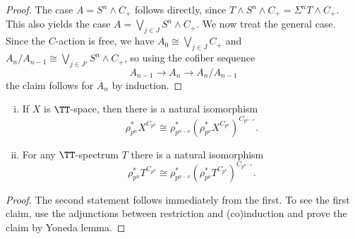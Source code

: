 \begin{proof}
The case $A= S^n\wedge C_+$ follows directly, since $T\wedge S^n\wedge C_+ = 
\Sigma^n T\wedge C_+$. This also yields the case $A = \bigvee_{j\in J} S^n\wedge C_+$.
We now treat the general case. Since the $C$-action
is free, we have 
$A_0 \cong \bigvee_{j\in J} C_+$ and $A_n/A_{n-1}\cong \bigvee_{j\in J'} S^n\wedge C_+$,
so using the cofiber sequence
\[A_{n-1}\to A_n\to A_n/A_{n-1} \]
the claim follows for $A_n$ by induction.
\end{proof}


\begin{lem}\label{lem:separatefixed}
\begin{enumerate}[(i)]
Let $n,\nu \in \NN_0$ such that $ \nu\le n$.
\item If $X$ is $\TT$-space, then there is a natural isomorphism 
$$\rho_{ p^n }^\ast X^{ C_{ p^n } } \cong \rho_{ p^{ n - \nu } }^\ast
\left( \rho_{ p^\nu }^\ast X^{ C_{ p^\nu } }\right)^{ C_{ p^{ n - \nu } } }.$$
\item For any $\TT$-spectrum $T$ there is a natural isomorphism
$$\rho_{ p^n }^\ast T^{ C_{ p^n } } \cong \rho_{ p^{ n - \nu } }^\ast
\left(\rho_{ p^\nu }^\ast T^{ C_{ p^\nu } }\right)^{ C_{ p^{ n - \nu } } }.$$
\end{enumerate}
\end{lem}

\begin{proof}
The second statement follows immediately from the first. To see the first claim, 
use the adjunctions between restriction and (co)induction and prove the claim
by Yoneda lemma. %
\end{proof}

%


